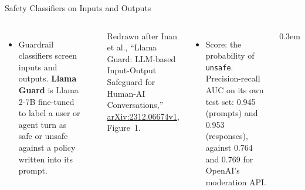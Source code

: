 \begin{frame}{Safety Classifiers on Inputs and Outputs}
  \begin{columns}[T,onlytextwidth]
      \begin{itemize}\footnotesize\itemsep0.25em
        \item[\textcolor{red}{$\blacktriangleright$}] Guardrail classifiers screen inputs and outputs. \textbf{Llama Guard} is Llama 2-7B fine-tuned to label a user or agent turn as safe or unsafe against a policy written into its prompt.
      \end{itemize}
      \vspace{0.1em}
      \centering
      \\[0.2em]
      {\scriptsize Redrawn after Inan et al., ``Llama Guard: LLM-based Input-Output Safeguard for Human-AI Conversations,'' \href{https://arxiv.org/abs/2312.06674v1}{arXiv:2312.06674v1}, Figure~1.\par}
      \begin{itemize}\footnotesize\itemsep0.25em
        \item[\textcolor{red}{$\blacktriangleright$}] Score: the probability of \texttt{unsafe}. Precision-recall AUC on its own test set: 0.945 (prompts) and 0.953 (responses), against 0.764 and 0.769 for OpenAI's moderation API.
      \end{itemize}
      \begin{itemize}\footnotesize\itemsep0.3em

\end{itemize}
\end{columns}
\end{frame}
